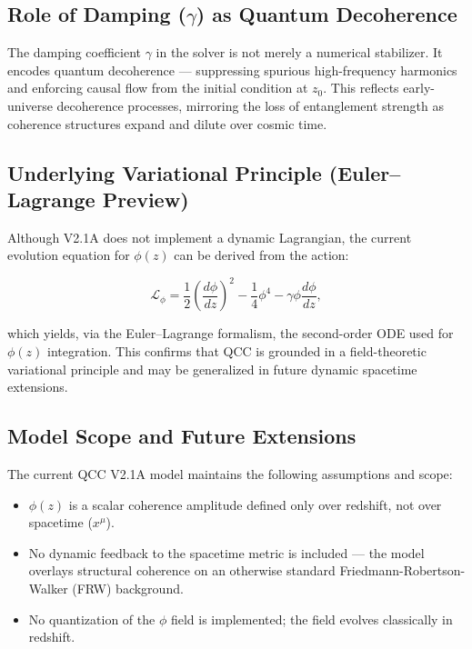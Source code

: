 \documentclass[12pt]{article}
\begin{document}
\subsection*{Role of Damping ($\gamma$) as Quantum Decoherence}

The damping coefficient $\gamma$ in the solver is not merely a numerical stabilizer. It encodes quantum decoherence — suppressing spurious high-frequency harmonics and enforcing causal flow from the initial condition at $z_0$. This reflects early-universe decoherence processes, mirroring the loss of entanglement strength as coherence structures expand and dilute over cosmic time.

\subsection*{Underlying Variational Principle (Euler–Lagrange Preview)}

Although V2.1A does not implement a dynamic Lagrangian, the current evolution equation for $\phi(z)$ can be derived from the action:

\begin{equation}
	\mathcal{L}_\phi = \frac{1}{2} \left( \frac{d\phi}{dz} \right)^2 - \frac{1}{4} \phi^4 - \gamma \phi \frac{d\phi}{dz},
\end{equation}

which yields, via the Euler–Lagrange formalism, the second-order ODE used for $\phi(z)$ integration. This confirms that QCC is grounded in a field-theoretic variational principle and may be generalized in future dynamic spacetime extensions.

\subsection*{Model Scope and Future Extensions}

The current QCC V2.1A model maintains the following assumptions and scope:
\begin{itemize}
	\item $\phi(z)$ is a scalar coherence amplitude defined only over redshift, not over spacetime ($x^\mu$).
	\item No dynamic feedback to the spacetime metric is included — the model overlays structural coherence on an otherwise standard Friedmann-Robertson-Walker (FRW) background.
	\item No quantization of the $\phi$ field is implemented; the field evolves classically in redshift.
\end{itemize}
\end{document}
